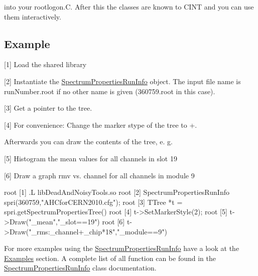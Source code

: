  into your rootlogon.C. After this the classes are known to CINT and you can use them interactively.\hypertarget{rootlib_Example}{}\subsection{Example}\label{rootlib_Example}
\begin{DoxyItemize}
\item \mbox{[}1\mbox{]} Load the shared library \item \mbox{[}2\mbox{]} Instantiate the \hyperlink{class_spectrum_properties_run_info}{SpectrumPropertiesRunInfo} object. The input file name is {\ttfamily runNumber.root} if no other name is given (360759.root in this case). \item \mbox{[}3\mbox{]} Get a pointer to the tree. \item \mbox{[}4\mbox{]} For convenience: Change the marker stype of the tree to {\ttfamily +}.\end{DoxyItemize}
Afterwards you can draw the contents of the tree, e. g. \begin{DoxyItemize}
\item \mbox{[}5\mbox{]} Histogram the mean values for all channels in slot 19 \item \mbox{[}6\mbox{]} Draw a graph rmv vs. channel for all channels in module 9\end{DoxyItemize}
\begin{DoxyVerb}
root [1] .L libDeadAndNoisyTools.so
root [2] SpectrumPropertiesRunInfo spri(360759,"AHCforCERN2010.cfg");
root [3] TTree *t = spri.getSpectrumPropertiesTree()
root [4] t->SetMarkerStyle(2);
root [5] t->Draw("_mean","_slot==19")
root [6] t->Draw("_rms:_channel+_chip*18","_module==9")
\end{DoxyVerb}


For more examples using the \hyperlink{class_spectrum_properties_run_info}{SpectrumPropertiesRunInfo} have a look at the \hyperlink{examples}{Examples} section. A complete list of all function can be found in the \hyperlink{class_spectrum_properties_run_info}{SpectrumPropertiesRunInfo} class documentation. 